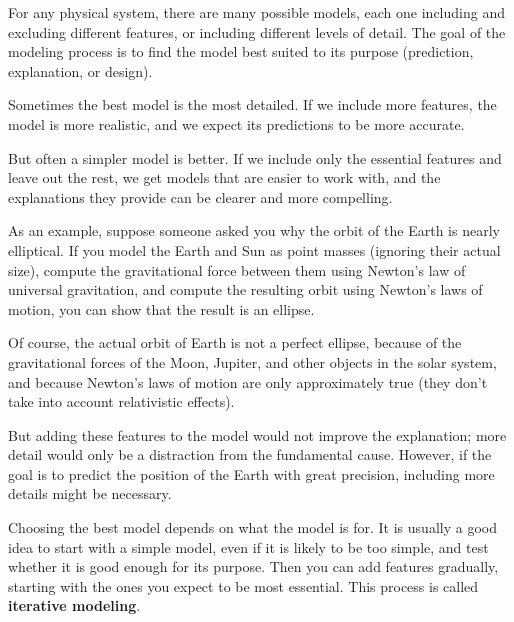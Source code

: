 \documentclass[12pt]{book}
\theoremstyle{exercise}
\begin{document}

For any physical system, there are many possible models, each one including and excluding different features, or including different levels of detail.  The goal of the modeling process is to find the model best suited to its purpose (prediction, explanation, or design).


Sometimes the best model is the most detailed.  If we include more features, the model is more realistic, and we expect its predictions to be more accurate.


But often a simpler model is better.  If we include only the essential features and leave out the rest, we get models that are easier to work with, and the explanations they provide can be clearer and more compelling.


As an example, suppose someone asked you why the orbit of the Earth is nearly elliptical.  If you model the Earth and Sun as point masses (ignoring their actual size), compute the gravitational force between them using Newton's law of universal gravitation, and compute the resulting orbit using Newton's laws of motion, you can show that the result is an ellipse.


Of course, the actual orbit of Earth is not a perfect ellipse, because of the gravitational forces of the Moon, Jupiter, and other objects in the solar system, and because Newton's laws of motion are only approximately true (they don't take into account relativistic effects).


But adding these features to the model would not improve the explanation; more detail would only be a distraction from the fundamental cause.  However, if the goal is to predict the position of the Earth with great precision, including more details might be necessary.  

Choosing the best model depends on what the model is for.  It is usually a good idea to start with a simple model, even if it is likely to be too simple, and test whether it is good enough for its purpose.  Then you can add features gradually, starting with the ones you expect to be most essential.  This process is called {\bf iterative modeling}.
\end{document}
